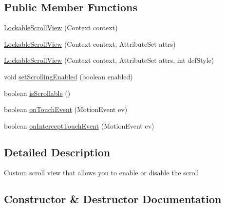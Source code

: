 \subsection*{Public Member Functions}
\begin{DoxyCompactItemize}
\item 
\hyperlink{classandroid_1_1app_1_1printerapp_1_1util_1_1ui_1_1_lockable_scroll_view_a9f3316997fd373d1045285da761e6722}{Lockable\+Scroll\+View} (Context context)
\item 
\hyperlink{classandroid_1_1app_1_1printerapp_1_1util_1_1ui_1_1_lockable_scroll_view_a31b4e574b776c3ab17a06af8992db5f3}{Lockable\+Scroll\+View} (Context context, Attribute\+Set attrs)
\item 
\hyperlink{classandroid_1_1app_1_1printerapp_1_1util_1_1ui_1_1_lockable_scroll_view_aca40faa9efe6dc161c0325dbb5caf1de}{Lockable\+Scroll\+View} (Context context, Attribute\+Set attrs, int def\+Style)
\item 
void \hyperlink{classandroid_1_1app_1_1printerapp_1_1util_1_1ui_1_1_lockable_scroll_view_ac08cbe9828daa79fc61b3639178cfaec}{set\+Scrolling\+Enabled} (boolean enabled)
\item 
boolean \hyperlink{classandroid_1_1app_1_1printerapp_1_1util_1_1ui_1_1_lockable_scroll_view_a4c47ae5ba2aab99f3f4cc6b45540386a}{is\+Scrollable} ()
\item 
boolean \hyperlink{classandroid_1_1app_1_1printerapp_1_1util_1_1ui_1_1_lockable_scroll_view_ac7db91d3021251c0e1486004bcf3a4dc}{on\+Touch\+Event} (Motion\+Event ev)
\item 
boolean \hyperlink{classandroid_1_1app_1_1printerapp_1_1util_1_1ui_1_1_lockable_scroll_view_aea4835015c70163965bb028393b1fae3}{on\+Intercept\+Touch\+Event} (Motion\+Event ev)
\end{DoxyCompactItemize}


\subsection{Detailed Description}
Custom scroll view that allows you to enable or disable the scroll 

\subsection{Constructor \& Destructor Documentation}
\mbox{\label{classandroid_1_1app_1_1printerapp_1_1util_1_1ui_1_1_lockable_scroll_view_a9f3316997fd373d1045285da761e6722}} 
